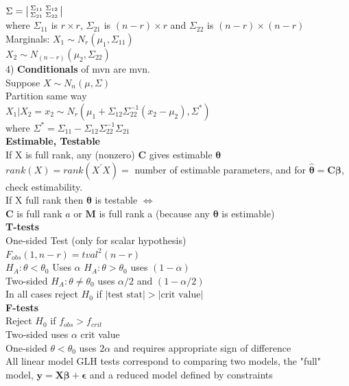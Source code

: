 \documentclass[10pt,landscape]{article}
\newenvironment{lsmallmatrix}
{\left|\begin{smallmatrix}}
	{\end{smallmatrix}\right|}
\newcommand{\B}{\beta}
\newcommand{\ta}{\theta}
\begin{document}
\begin{multicols*}{4}
	$\Sigma=
	\begin{lsmallmatrix}
	\Sigma_{11}&\Sigma_{12}\\
	\Sigma_{21}&\Sigma_{22}
	\end{lsmallmatrix}$\\
	where $\Sigma_{11}$ is $r\times r$, $\Sigma_{21}$ is $(n-r)\times r$ and $\Sigma_{22}$ is $(n-r)\times (n-r)$\\
	Marginals:
	$X_1\sim N_r(\mu_1,\Sigma_{11})$\\ 
 $X_2\sim N_{(n-r)}(\mu_2,\Sigma_{22})$\\
4) \textbf{Conditionals} of mvn are mvn.\\
	Suppose $X\sim N_n(\mu,\Sigma)$\\
Partition same way\\
	$X_1|X_2=x_2\sim N_r(\mu_1+\Sigma_{12}\Sigma_{22}^{-1}(x_2-\mu_2),\Sigma^*)$\\
	where $\Sigma^*=\Sigma_{11}-\Sigma_{12}\Sigma_{22}^{-1}\Sigma_{21}$\\
\textbf{Estimable, Testable}\\
If X is full rank, any (nonzero) $\bm{C}$ gives estimable $\bm{\theta}$\\
$rank(X)=rank(X^{\prime}X)=$ number of estimable parameters, and for $\bm{\hat{\theta}}=\bm{C\B}$, check estimability.\\
If X full rank then $\bm{\theta}$ is testable $\Leftrightarrow$\\
$\bm{C}$ is full rank $a$ or $\bm{M}$ is full rank a (because any $\bm{\theta}$ is estimable)\\
\textbf{T-tests}\\
One-sided Test (only for scalar hypothesis)\\
$F_{obs}(1,n-r)=tval^2(n-r)$\\
$H_A:\ta<\ta_0$ Uses $\alpha$ $H_A:\ta>\ta_0$ uses $(1-\alpha)$\\
Two-sided $H_A:\ta\neq \ta_0$ uses $\alpha/2$ and $(1-\alpha/2)$\\
In all cases reject $H_0$ if $|\text{test stat}|>|\text{crit value}|$\\
\textbf{F-tests}\\
Reject $H_0$ if $f_{obs}>f_{crit}$\\
Two-sided uses $\alpha$ crit value\\
One-sided $\ta<\ta_0$ uses $2\alpha$ and requires appropriate sign of difference\\
All linear model GLH tests correspond to comparing two models, the "full" model, $\bm{y}=\bm{X\B}+\bm{\epsilon}$ and a reduced model defined by constraints\\

\end{multicols*}
\end{document}
